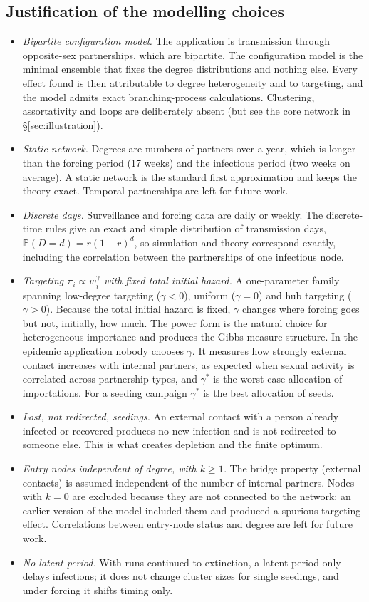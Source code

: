 \documentclass[11pt,a4paper]{article}
\theoremstyle{definition}
\theoremstyle{remark}
\newcommand{\Prob}{\mathbb{P}}
\begin{document}
\subsection*{Justification of the modelling choices}
\begin{itemize}
\item \emph{Bipartite configuration model.} The application is transmission
through opposite-sex partnerships, which are bipartite. The configuration
model is the minimal ensemble that fixes the degree distributions and nothing
else. Every effect found is then attributable to degree heterogeneity and to
targeting, and the model admits exact branching-process calculations.
Clustering, assortativity and loops are deliberately absent (but see the core
network in \S\ref{sec:illustration}).
\item \emph{Static network.} Degrees are numbers of partners over a year, which
is longer than the forcing period (17 weeks) and the infectious period (two
weeks on average). A static network is the standard first approximation and
keeps the theory exact. Temporal partnerships are left for future work.
\item \emph{Discrete days.} Surveillance and forcing data are daily or weekly. The
discrete-time rules give an exact and simple distribution of transmission
days, $\Prob(D=d)=r(1-r)^d$, so simulation and theory correspond exactly, including
the correlation between the partnerships of one infectious node.
\item \emph{Targeting $\pi_i\propto w_i^\gamma$ with fixed total initial hazard.} A one-parameter
family spanning low-degree targeting ($\gamma<0$), uniform ($\gamma=0$) and hub targeting
($\gamma>0$). Because the total initial hazard is fixed, $\gamma$ changes where forcing goes
but not, initially, how much. The power form is the natural choice for
heterogeneous importance and produces the Gibbs-measure structure. In the
epidemic application nobody chooses $\gamma$. It measures how strongly external
contact increases with internal partners, as expected when sexual activity is
correlated across partnership types, and $\gamma^*$ is the worst-case allocation of
importations. For a seeding campaign $\gamma^*$ is the best allocation of seeds.
\item \emph{Lost, not redirected, seedings.} An external contact with a person
already infected or recovered produces no new infection and is not
redirected to someone else. This is what creates depletion and the finite
optimum.
\item \emph{Entry nodes independent of degree, with $k\ge1$.} The bridge property
(external contacts) is assumed independent of the number of internal
partners. Nodes with $k=0$ are excluded because they are not connected to the
network; an earlier version of the model included them and produced a
spurious targeting effect. Correlations between entry-node status and degree
are left for future work.
\item \emph{No latent period.} With runs continued to extinction, a latent period
only delays infections; it does not change cluster sizes for single seedings,
and under forcing it shifts timing only.
\end{itemize}
\end{document}
